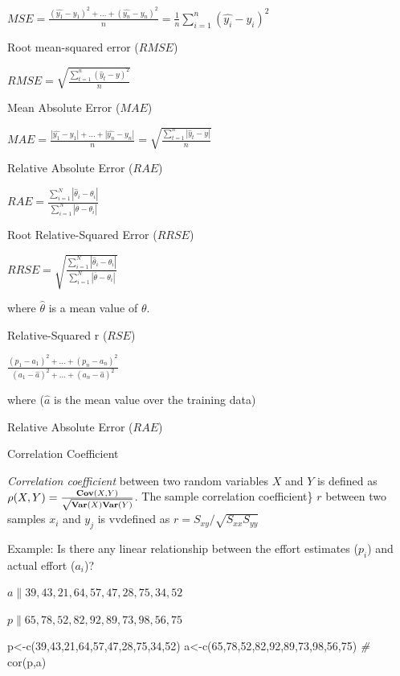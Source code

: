 \documentclass[
]{book}
\newenvironment{Shaded}{\begin{snugshade}}{\end{snugshade}}
\newcommand{\CommentTok}[1]{\textcolor[rgb]{0.56,0.35,0.01}{\textit{#1}}}
\newcommand{\DecValTok}[1]{\textcolor[rgb]{0.00,0.00,0.81}{#1}}
\newcommand{\FunctionTok}[1]{\textcolor[rgb]{0.00,0.00,0.00}{#1}}
\newcommand{\NormalTok}[1]{#1}
\newcommand{\OtherTok}[1]{\textcolor[rgb]{0.56,0.35,0.01}{#1}}
\begin{document}
\(MSE = \frac{(\hat{y_1} - y_1)^2 + \ldots +(\hat{y_n} - y_n)^2}{n} = \frac{1}{n}\sum_{i=1}^n(\hat{y_i} - y_i)^2\)

Root mean-squared error (\(RMSE\))

\({RMSE} = \sqrt{\frac{\sum_{t=1}^n (\hat y_t - y)^2}{n}}\)

Mean Absolute Error (\(MAE\))

\(MAE = \frac{|\hat{y_1} - y_1| + \ldots +|\hat{y_n} - y_n|}{n} = \sqrt{\frac{\sum_{t=1}^n |\hat y_t - y|}{n}}\)

Relative Absolute Error (\(RAE\))

\(RAE = \frac{ \sum^N_{i=1} | \hat{\theta}_i - \theta_i | } { \sum^N_{i=1} | \overline{\theta} - \theta_i | }\)

Root Relative-Squared Error (\(RRSE\))

\(RRSE = \sqrt{ \frac{ \sum^N_{i=1} | \hat{\theta}_i - \theta_i | } { \sum^N_{i=1} | \overline{\theta} - \theta_i | } }\)

where \(\hat{\theta}\) is a mean value of \(\theta\).

Relative-Squared r (\(RSE\))

\(\frac{(p_1-a_1)^2 + \ldots +(p_n-a_n)^2}{(a_1-\hat{a})^2 + \ldots + (a_n-\hat{a})^2}\)

where (\(\hat{a}\) is the mean value over the training data)

Relative Absolute Error (\(RAE\))

Correlation Coefficient

\emph{Correlation coefficient} between two random variables \(X\) and \(Y\) is defined as \(\rho(X,Y) = \frac{{\bf Cov}(X,Y)}{\sqrt{{\bf Var}(X){\bf Var}(Y)}}\). The sample correlation coefficient\} \(r\) between two samples \(x_i\) and \(y_j\) is vvdefined as \(r = S_{xy}/\sqrt{S_{xx}S_{yy}}\)

Example: Is there any linear relationship between the effort estimates (\(p_i\)) and actual effort (\(a_i\))?

\(a\|39,43,21,64,57,47,28,75,34,52\)

\(p\|65,78,52,82,92,89,73,98,56,75\)

\begin{Shaded}
\begin{Highlighting}[]
\NormalTok{p}\OtherTok{\textless{}{-}}\FunctionTok{c}\NormalTok{(}\DecValTok{39}\NormalTok{,}\DecValTok{43}\NormalTok{,}\DecValTok{21}\NormalTok{,}\DecValTok{64}\NormalTok{,}\DecValTok{57}\NormalTok{,}\DecValTok{47}\NormalTok{,}\DecValTok{28}\NormalTok{,}\DecValTok{75}\NormalTok{,}\DecValTok{34}\NormalTok{,}\DecValTok{52}\NormalTok{)}
\NormalTok{a}\OtherTok{\textless{}{-}}\FunctionTok{c}\NormalTok{(}\DecValTok{65}\NormalTok{,}\DecValTok{78}\NormalTok{,}\DecValTok{52}\NormalTok{,}\DecValTok{82}\NormalTok{,}\DecValTok{92}\NormalTok{,}\DecValTok{89}\NormalTok{,}\DecValTok{73}\NormalTok{,}\DecValTok{98}\NormalTok{,}\DecValTok{56}\NormalTok{,}\DecValTok{75}\NormalTok{)}
\CommentTok{\#}
\FunctionTok{cor}\NormalTok{(p,a)}
\end{Highlighting}
\end{Shaded}
\end{document}
